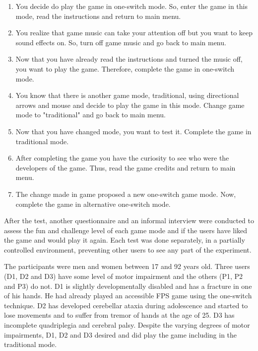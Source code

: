 \documentclass[a4paper]{sbgames}               %
\begin{document}
\begin{enumerate}\label{tasksList}
  \item You decide do play the game in one-switch mode. So, enter the game in this mode, read the instructions and return to main menu.
  
  \item You realize that game music can take your attention off but you want to keep sound effects on. So, turn off game music and go back to main menu.
  
  \item Now that you have already read the instructions and turned the music off, you want to play the game. Therefore, complete the game in one-switch mode.
  
  \item You know that there is another game mode, traditional, using directional arrows and mouse and decide to play the game in this mode. Change game mode to "traditional" and go back to main menu.

  \item Now that you have changed mode, you want to test it. Complete the game in traditional mode.
  
  \item After completing the game you have the curiosity to see who were the developers of the game. Thus, read the game credits and return to main menu.

  \item The change made in game proposed a new one-switch game mode. Now, complete the game in alternative one-switch mode.

\end{enumerate}
After the test, another questionnaire and an informal interview were conducted to assess the fun and challenge level of each game mode and if the users have liked the game and would play it again. Each test was done separately, in a partially controlled environment, preventing other users to see any part of the experiment.

The participants were men and women between 17 and 92 years old. Three users (D1, D2 and D3) have some level of motor impairment and the others (P1, P2 and P3) do not. D1 is slightly developmentally disabled and has a fracture in one of his hands. He had already played an accessible FPS game using the one-switch technique. D2 has developed cerebellar ataxia during adolescence and started to lose movements and to suffer from tremor of hands at the age of 25. D3 has incomplete quadriplegia and cerebral palsy. Despite the varying degrees of motor impairments, D1, D2 and D3 desired and did play the game including in the traditional mode.
\end{document}

